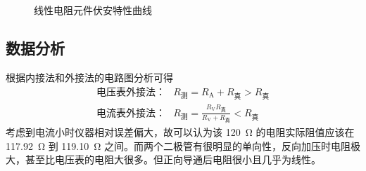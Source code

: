 \documentclass[a4paper,utf8]{article}
\begin{document}
\begin{figure}[!ht]
    \caption{线性电阻元件伏安特性曲线}
    \\
    \\
\end{figure}
\clearpage
\subsection{数据分析}
根据内接法和外接法的电路图分析可得
\begin{align*}
    \text{电压表外接法：}&R_\text{测}=R_\text{A}+R_\text{真} > R_\text{真} \\
    \text{电流表外接法：}&R_\text{测}=\frac{R_\text{V} R_\text{真}}{R_\text{V}+R_\text{真}} < R_\text{真}
\end{align*}
考虑到电流小时仪器相对误差偏大，故可以认为该 \SI{120}{\ohm} 的电阻实际阻值应该在 \SI{117.92}{\ohm} 到 \SI{119.10}{\ohm} 之间。而两个二极管有很明显的单向性，反向加压时电阻极大，甚至比电压表的电阻大很多。但正向导通后电阻很小且几乎为线性。
\end{document}
